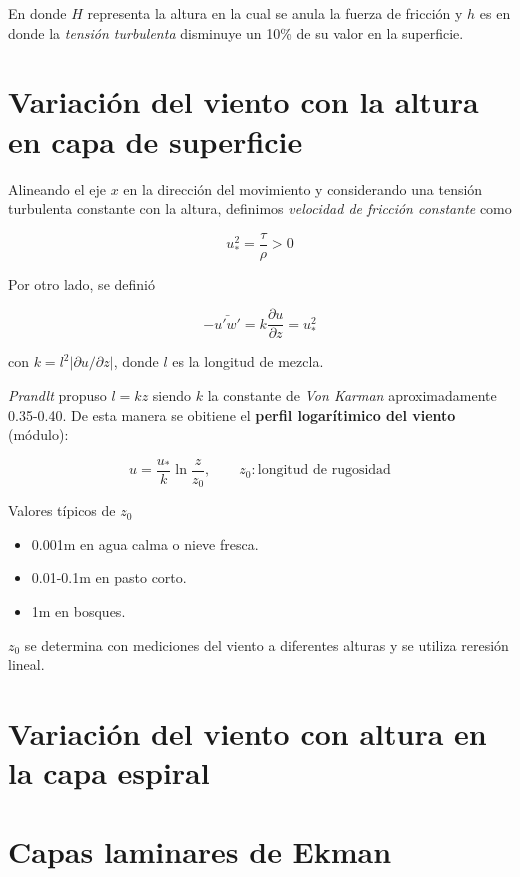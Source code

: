 \documentclass[openany]{book}
\begin{document}
En donde $H$ representa la altura en la cual se anula la fuerza de
fricción y $h$ es en donde la \emph{tensión turbulenta} disminuye un
10\% de su valor en la superficie.

\section{Variación del viento con la altura en capa de superficie}
Alineando el eje $x$ en la dirección del movimiento y considerando una
tensión turbulenta constante con la altura, definimos \emph{velocidad
de fricción constante} como

\begin{equation}
    u_{*}^{2}=\frac{\tau}{\rho}>0
\end{equation}

\par Por otro lado, se definió

\begin{equation}
    -\bar{u'w'}=k \frac{\partial u}{\partial z}=u_{*}^{2}
\end{equation}

con $k=l^{2}\left|\partial u/\partial z\right|$, donde $l$ es la
longitud de mezcla.

\par \emph{Prandlt} propuso $l=kz$ siendo $k$ la constante de \emph{Von
Karman} aproximadamente 0.35-0.40. De esta manera se obitiene el
\textbf{perfil logarítimico del viento} (módulo):

\begin{equation}
    u=\frac{u_{*}}{k}\ln{\frac{z}{z_0}},\qquad z_0:\textrm{longitud de rugosidad}
\end{equation}

\par Valores típicos de $z_0$
\begin{itemize}
    \item 0.001m en agua calma o nieve fresca.
    \item 0.01-0.1m en pasto corto.
    \item 1m en bosques.
\end{itemize}
$z_0$ se determina con mediciones del viento a diferentes alturas y se
utiliza reresión lineal.

\section{Variación del viento con altura en la capa espiral}

\section{Capas laminares de Ekman}
\end{document}
